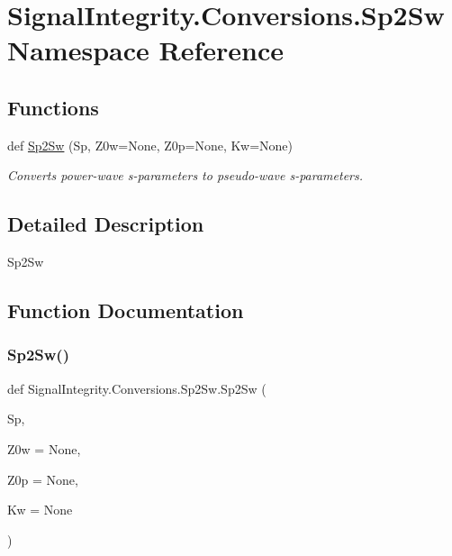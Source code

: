 \hypertarget{namespaceSignalIntegrity_1_1Conversions_1_1Sp2Sw}{}\section{Signal\+Integrity.\+Conversions.\+Sp2\+Sw Namespace Reference}
\label{namespaceSignalIntegrity_1_1Conversions_1_1Sp2Sw}
\subsection*{Functions}
\begin{DoxyCompactItemize}
\item 
def \hyperlink{namespaceSignalIntegrity_1_1Conversions_1_1Sp2Sw_a4a740fef08f0926d59cf61fd15240182}{Sp2\+Sw} (Sp, Z0w=None, Z0p=None, Kw=None)
\begin{DoxyCompactList}\small\item\em Converts power-\/wave s-\/parameters to pseudo-\/wave s-\/parameters. \end{DoxyCompactList}\end{DoxyCompactItemize}


\subsection{Detailed Description}
\begin{DoxyVerb}Sp2Sw\end{DoxyVerb}
 

\subsection{Function Documentation}
\mbox{\label{namespaceSignalIntegrity_1_1Conversions_1_1Sp2Sw_a4a740fef08f0926d59cf61fd15240182}} 
\subsubsection{\texorpdfstring{Sp2\+Sw()}{Sp2Sw()}}
{\footnotesize\ttfamily def Signal\+Integrity.\+Conversions.\+Sp2\+Sw.\+Sp2\+Sw (\begin{DoxyParamCaption}\item[{}]{Sp,  }\item[{}]{Z0w = {\ttfamily None},  }\item[{}]{Z0p = {\ttfamily None},  }\item[{}]{Kw = {\ttfamily None} }\end{DoxyParamCaption})}



